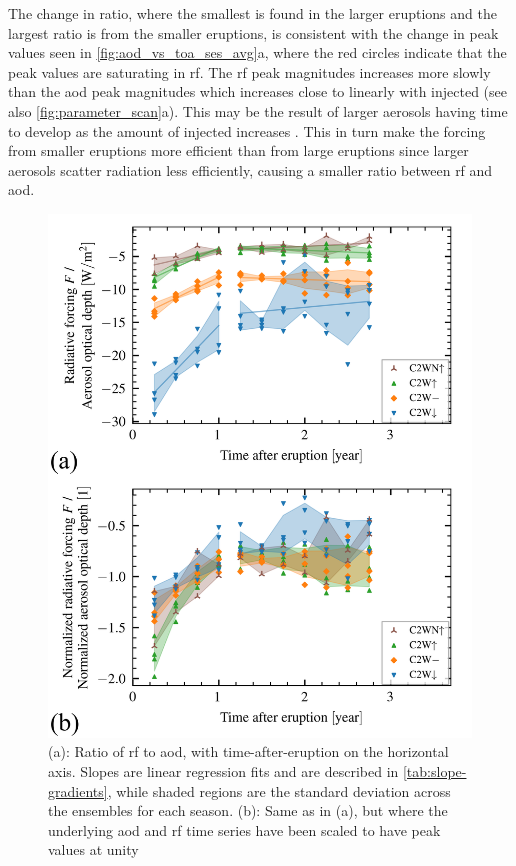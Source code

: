 \documentclass{ametsocV6.1}
\begin{document}
The change in ratio, where the smallest is found in the larger eruptions and the largest
ratio is from the smaller eruptions, is consistent with the change in peak values seen
in \ref{fig:aod_vs_toa_ses_avg}a, where the red circles indicate that the peak values
are saturating in \gls{rf}. The \gls{rf} peak magnitudes increases more slowly than the
\gls{aod} peak magnitudes which increases close to linearly with injected  (see
also \ref{fig:parameter_scan}a). This may be the result of larger aerosols having time
to develop as the amount of injected  increases
\citep{niemeier2015,marshall2019}. This in turn make the forcing from smaller eruptions
more efficient than from large eruptions since larger aerosols scatter radiation less
efficiently, causing a smaller ratio between \gls{rf} and \gls{aod}.

\begin{figure}
  \centering
  \includegraphics[width=0.95\linewidth]{figures/aod_vs_toa_loop.png}

  \caption{(a): Ratio of \gls{rf} to \gls{aod}, with time-after-eruption on the horizontal
    axis. Slopes are linear regression fits and are described in \ref{tab:slope-gradients},
    while shaded regions are the standard deviation across the ensembles for each season.
    (b): Same as in (a), but where the underlying \gls{aod} and \gls{rf} time series have
    been scaled to have peak values at unity}\label{fig:aod_vs_toa_avg_loop_ratios}%
\end{figure}
\end{document}
